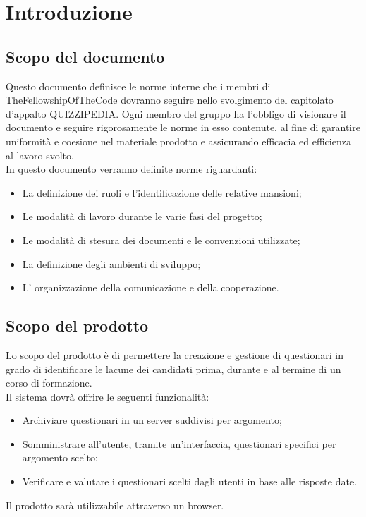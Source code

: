 \section{Introduzione}

\subsection{Scopo del documento}
Questo documento definisce le norme interne che i membri di TheFellowshipOfTheCode dovranno seguire nello svolgimento del capitolato d'appalto QUIZZIPEDIA. Ogni membro del gruppo ha l'obbligo di visionare il documento e seguire rigorosamente le norme in esso contenute, al fine di garantire uniformità e coesione nel materiale prodotto e assicurando efficacia ed efficienza al lavoro svolto.
\\In questo documento verranno definite norme riguardanti:
\begin{itemize}
\item
La definizione dei ruoli e l'identificazione delle relative mansioni;	
\item
Le modalità di lavoro durante le varie fasi del progetto;
\item
Le modalità di stesura dei documenti e le convenzioni utilizzate;
\item
La definizione degli ambienti di sviluppo;
\item
L' organizzazione della comunicazione e della cooperazione.
\end{itemize}

\subsection{Scopo del prodotto}
Lo scopo del prodotto è di permettere la creazione e gestione di questionari in grado di identificare le lacune dei candidati prima, durante e al termine di un corso di formazione. 
\\Il sistema dovrà offrire le seguenti funzionalità:
\begin{itemize}
\item
Archiviare questionari in un server suddivisi per argomento;
\item
Somministrare all'utente, tramite un'interfaccia, questionari specifici per argomento scelto;
\item
Verificare e valutare i questionari scelti dagli utenti in base alle risposte date.
\end{itemize}

Il prodotto sarà utilizzabile attraverso un browser.

